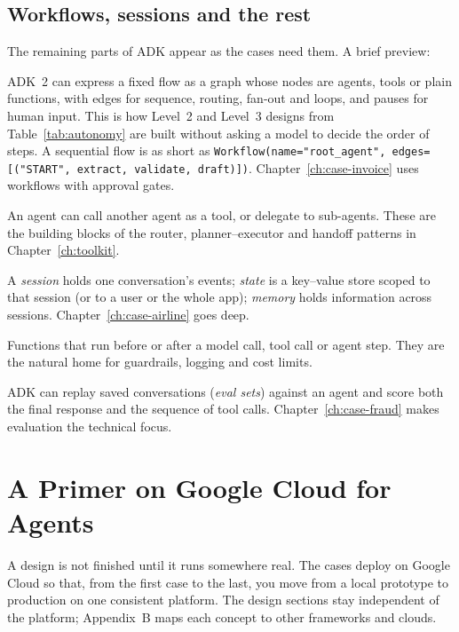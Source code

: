 \subsection{Workflows, sessions and the rest}

The remaining parts of ADK appear as the cases need them. A brief preview:
\begin{description}[leftmargin=1em,itemsep=2pt]
  \item[Workflows.] ADK~2 can express a fixed flow as a graph whose nodes are agents, tools or plain functions, with edges for sequence, routing, fan-out and loops, and pauses for human input. This is how Level~2 and Level~3 designs from Table~\ref{tab:autonomy} are built without asking a model to decide the order of steps. A sequential flow is as short as \texttt{Workflow(name="root\_agent", edges=[("START", extract, validate, draft)])}. Chapter~\ref{ch:case-invoice} uses workflows with approval gates.
  \item[Agents as tools and sub-agents.] An agent can call another agent as a tool, or delegate to sub-agents. These are the building blocks of the router, planner--executor and handoff patterns in Chapter~\ref{ch:toolkit}.
  \item[Sessions, state and memory.] A \emph{session} holds one conversation's events; \emph{state} is a key--value store scoped to that session (or to a user or the whole app); \emph{memory} holds information across sessions. Chapter~\ref{ch:case-airline} goes deep.
  \item[Callbacks.] Functions that run before or after a model call, tool call or agent step. They are the natural home for guardrails, logging and cost limits.
  \item[Evaluation.] ADK can replay saved conversations (\emph{eval sets}) against an agent and score both the final response and the sequence of tool calls. Chapter~\ref{ch:case-fraud} makes evaluation the technical focus.
\end{description}

\section{A Primer on Google Cloud for Agents}
\label{sec:gcp}

A design is not finished until it runs somewhere real. The cases deploy on Google Cloud so that, from the first case to the last, you move from a local prototype to production on one consistent platform. The design sections stay independent of the platform; Appendix~B maps each concept to other frameworks and clouds.

